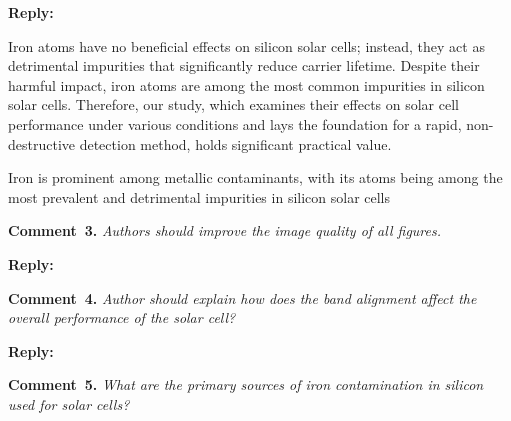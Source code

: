 \documentclass[a4paper,fleqn]{cas-sc}
\begin{document}

\noindent
\textcolor[rgb]{0.51,0.00,0.00}{\textbf{Reply:}}

Iron atoms have no beneficial effects on silicon solar cells; 
instead, they act as detrimental impurities that significantly reduce carrier lifetime. 
Despite their harmful impact, iron atoms are among the most common impurities in silicon solar cells. 
Therefore, our study, which examines their effects on solar cell performance under various conditions and lays the foundation for a rapid, non-destructive detection method, holds significant practical value.





Iron is prominent among metallic contaminants, with its atoms being among the most prevalent and detrimental
impurities in silicon solar cells


%

\vspace{1cm}
\noindent
\textcolor[rgb]{0.00,0.50,1.00}{\textbf{Comment~3.}}
\emph{Authors should improve the image quality of all figures.}


\noindent
\textcolor[rgb]{0.51,0.00,0.00}{\textbf{Reply:}}



\vspace{1cm}
\noindent
\textcolor[rgb]{0.00,0.50,1.00}{\textbf{Comment~4.}}
\emph{Author should explain how does the band alignment affect the overall performance of the solar cell?}


\noindent
\textcolor[rgb]{0.51,0.00,0.00}{\textbf{Reply:}}



\vspace{1cm}
\noindent
\textcolor[rgb]{0.00,0.50,1.00}{\textbf{Comment~5.}}
\emph{What are the primary sources of iron contamination in silicon used for solar cells?}

\end{document}
